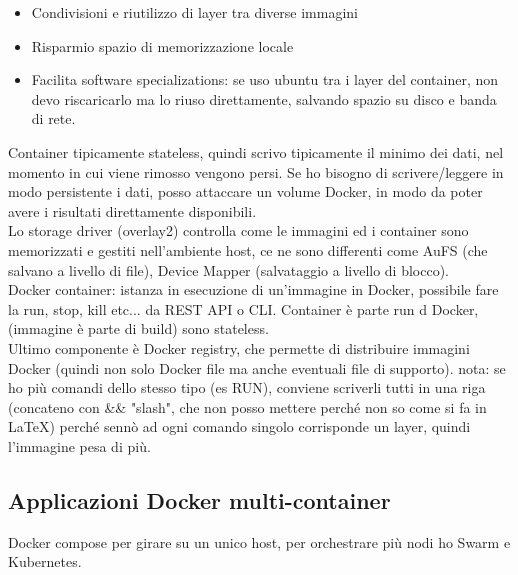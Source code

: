 \documentclass{article}
\begin{document}
\begin{itemize}
\item Condivisioni e riutilizzo di layer tra diverse immagini
\item Risparmio spazio di memorizzazione locale
\item Facilita software specializations: se uso ubuntu tra i layer del container, non devo riscaricarlo ma lo riuso direttamente,  salvando spazio su disco e banda di rete.
\end{itemize}
Container tipicamente stateless, quindi scrivo tipicamente il minimo dei dati, nel momento in cui viene rimosso vengono persi. Se ho bisogno di scrivere/leggere in modo persistente i dati, posso attaccare un volume Docker, in modo da poter avere i risultati direttamente disponibili.\\ Lo storage driver (overlay2) controlla come le immagini ed i container sono memorizzati e gestiti nell'ambiente host, ce ne sono differenti come AuFS (che salvano a livello di file), Device Mapper (salvataggio a livello di blocco).\\ Docker container: istanza in esecuzione di un'immagine in Docker, possibile fare la run, stop, kill etc... da REST API o CLI. Container è parte run d Docker, (immagine è parte di build) sono stateless.\\ Ultimo componente è Docker registry, che permette di distribuire immagini Docker (quindi non solo Docker file ma anche eventuali file di supporto).
nota: se ho più comandi dello stesso tipo (es RUN), conviene scriverli tutti in una riga (concateno con \&\& "slash", che non posso mettere perché non so come si fa in LaTeX) perché sennò ad ogni comando singolo corrisponde un layer, quindi l'immagine pesa di più.
\subsection{Applicazioni Docker multi-container}
Docker compose per girare su un unico host, per orchestrare più nodi ho Swarm e Kubernetes.
\end{document}
